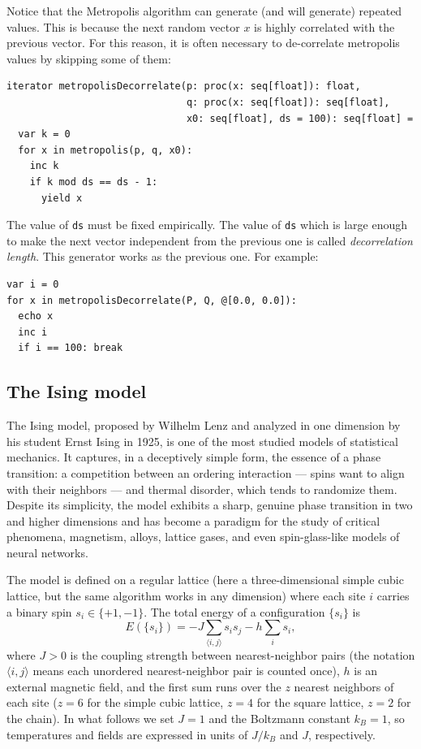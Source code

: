 \documentclass[justified, sixbynine]{tufte-book}
\def\ft{\small\tt}
\theoremstyle{plain}%
\newtheorem * {corollary}{Corollary}
\theoremstyle{definition}
\theoremstyle{remark}
\newtheorem * {remark}{Remark}
\newtheorem * {note}{Note}
\begin{document}
\begin{fullwidth}

Notice that the Metropolis algorithm can generate (and will generate) repeated values. This is because the next random vector $x$ is highly correlated with the previous vector. For this reason, it is often necessary to de-correlate metropolis values by skipping some of them:

\begin{lstlisting}
iterator metropolisDecorrelate(p: proc(x: seq[float]): float,
                               q: proc(x: seq[float]): seq[float],
                               x0: seq[float], ds = 100): seq[float] =
  var k = 0
  for x in metropolis(p, q, x0):
    inc k
    if k mod ds == ds - 1:
      yield x
\end{lstlisting}

The value of {\ft ds} must be fixed empirically. The value of {\ft ds} which is large enough to make the next vector independent from the previous one is called {\it decorrelation length}. This generator works as the previous one. For example:

\begin{lstlisting}
var i = 0
for x in metropolisDecorrelate(P, Q, @[0.0, 0.0]):
  echo x
  inc i
  if i == 100: break
\end{lstlisting}

\subsection{The Ising model}

The Ising model, proposed by Wilhelm Lenz and analyzed in one dimension by his student Ernst Ising in 1925, is one of the most studied models of statistical mechanics. It captures, in a deceptively simple form, the essence of a phase transition: a competition between an ordering interaction --- spins want to align with their neighbors --- and thermal disorder, which tends to randomize them. Despite its simplicity, the model exhibits a sharp, genuine phase transition in two and higher dimensions and has become a paradigm for the study of critical phenomena, magnetism, alloys, lattice gases, and even spin-glass-like models of neural networks.

The model is defined on a regular lattice (here a three-dimensional simple cubic lattice, but the same algorithm works in any dimension) where each site $i$ carries a binary spin $s_i \in \{+1, -1\}$. The total energy of a configuration $\{s_i\}$ is
\begin{equation}
E(\{s_i\}) = -J \sum_{\langle i, j \rangle} s_i s_j - h \sum_i s_i,
\end{equation}
where $J > 0$ is the coupling strength between nearest-neighbor pairs (the notation $\langle i, j \rangle$ means each unordered nearest-neighbor pair is counted once), $h$ is an external magnetic field, and the first sum runs over the $z$ nearest neighbors of each site ($z = 6$ for the simple cubic lattice, $z = 4$ for the square lattice, $z = 2$ for the chain). In what follows we set $J = 1$ and the Boltzmann constant $k_B = 1$, so temperatures and fields are expressed in units of $J/k_B$ and $J$, respectively.


\end{fullwidth}
\end{document}
